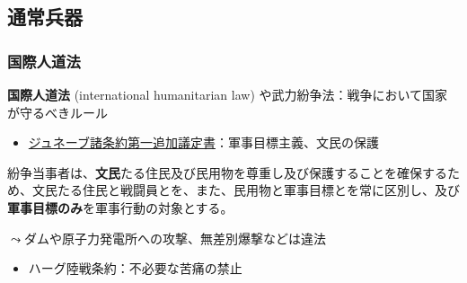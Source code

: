 \documentclass[
  xelatex,
  ja=standard]{bxjsarticle}
\providecommand{\tightlist}{%
  \setlength{\itemsep}{0pt}\setlength{\parskip}{0pt}}\usepackage{longtable,booktabs,array}
\begin{document}
\hypertarget{ux901aux5e38ux5175ux5668}{%
\subsection{通常兵器}\label{ux901aux5e38ux5175ux5668}}

\hypertarget{ux56fdux969bux4ebaux9053ux6cd5}{%
\subsubsection{国際人道法}\label{ux56fdux969bux4ebaux9053ux6cd5}}

\textbf{国際人道法} (international humanitarian law)
や武力紛争法：戦争において国家が守るべきルール

\begin{itemize}
\tightlist
\item
  \href{https://www.mofa.go.jp/mofaj/gaiko/k_jindo/giteisho.html}{ジュネーブ諸条約第一追加議定書}：軍事目標主義、文民の保護
\end{itemize}

\begin{tcolorbox}[enhanced jigsaw, left=2mm, toprule=.15mm, opacityback=0, colframe=quarto-callout-note-color-frame, opacitybacktitle=0.6, breakable, coltitle=black, colbacktitle=quarto-callout-note-color!10!white, colback=white, bottomtitle=1mm, toptitle=1mm, titlerule=0mm, title=\textcolor{quarto-callout-note-color}{\faInfo}\hspace{0.5em}{\href{https://www1.doshisha.ac.jp/~karai/intlaw/docs/ap1.htm}{ジュネーブ諸条約第一追加議定書}　第48条}, arc=.35mm, rightrule=.15mm, bottomrule=.15mm, leftrule=.75mm]

紛争当事者は、\textbf{文民}たる住民及び民用物を尊重し及び保護することを確保するため、文民たる住民と戦闘員とを、また、民用物と軍事目標とを常に区別し、及び\textbf{軍事目標のみ}を軍事行動の対象とする。

\end{tcolorbox}

\(\leadsto\)ダムや原子力発電所への攻撃、無差別爆撃などは違法

\begin{itemize}
\tightlist
\item
  ハーグ陸戦条約：不必要な苦痛の禁止
\end{itemize}
\end{document}
